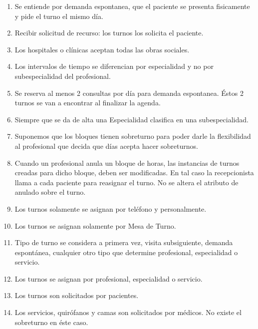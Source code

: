 \documentclass[a4paper,11pt]{article}
\begin{document}
\begin{enumerate}
\item Se entiende por demanda espontanea, que el paciente se presenta fisicamente y pide el turno el mismo día.

\item Recibir solicitud de recurso: los turnos los solicita el paciente.

\item Los hospitales o clínicas aceptan todas las obras sociales.

\item Los intervalos de tiempo se diferencian por especialidad y no por subespecialidad del profesional.

\item Se reserva al menos 2 consultas por día para demanda espontanea.
      Éstos 2 turnos se van a encontrar al finalizar la agenda.

\item Siempre que se da de alta una Especialidad clasifica en una subespecialidad.

\item Suponemos que los bloques tienen sobreturno para poder darle la flexibilidad al profesional 
      que decida que días acepta hacer sobreturnos.

\item Cuando un profesional anula un bloque de horas, las instancias de turnos creadas para dicho bloque, 
      deben ser modificadas. En tal caso la recepcionista llama a cada paciente para reasignar el turno.
      No se altera el atributo de anulado sobre el turno.

\item Los turnos solamente se asignan por teléfono y personalmente.

\item Los turnos se asignan solamente por Mesa de Turno.

\item Tipo de turno se considera a primera vez, visita subsiguiente, demanda espontánea, cualquier otro 
      tipo que determine profesional, especialidad o servicio.

\item Los turnos se asignan por profesional, especialidad o servicio.

\item Los turnos son solicitados por pacientes.

\item Los servicios, quirófanos y camas son solicitados por médicos. No existe el sobreturno en éste caso.


\end{enumerate}
\end{document}
